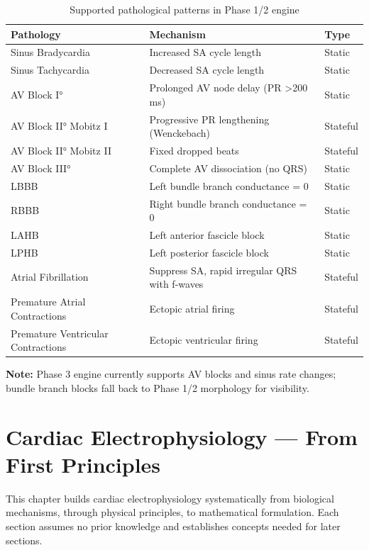 \documentclass[12pt,oneside,a4paper]{book}
\newcommand{\note}[1]{\textbf{Note:} #1}
\begin{document}
\begin{table}[H]
\centering
\begin{tabularx}{\textwidth}{|l|X|l|}
\hline
\textbf{Pathology} & \textbf{Mechanism} & \textbf{Type} \\
\hline
Sinus Bradycardia & Increased SA cycle length & Static \\
Sinus Tachycardia & Decreased SA cycle length & Static \\
AV Block I° & Prolonged AV node delay (PR \textgreater 200 ms) & Static \\
AV Block II° Mobitz I & Progressive PR lengthening (Wenckebach) & Stateful \\
AV Block II° Mobitz II & Fixed dropped beats & Stateful \\
AV Block III° & Complete AV dissociation (no QRS) & Static \\
LBBB & Left bundle branch conductance = 0 & Static \\
RBBB & Right bundle branch conductance = 0 & Static \\
LAHB & Left anterior fascicle block & Static \\
LPHB & Left posterior fascicle block & Static \\
Atrial Fibrillation & Suppress SA, rapid irregular QRS with f-waves & Stateful \\
Premature Atrial Contractions & Ectopic atrial firing & Stateful \\
Premature Ventricular Contractions & Ectopic ventricular firing & Stateful \\
\hline
\end{tabularx}
\caption{Supported pathological patterns in Phase 1/2 engine}
\label{tab:pathologies}
\end{table}

\note{Phase 3 engine currently supports AV blocks and sinus rate changes; bundle branch blocks fall back to Phase 1/2 morphology for visibility.}


\chapter{Cardiac Electrophysiology — From First Principles}

This chapter builds cardiac electrophysiology systematically from biological mechanisms, through physical principles, to mathematical formulation. Each section assumes no prior knowledge and establishes concepts needed for later sections.
\end{document}

